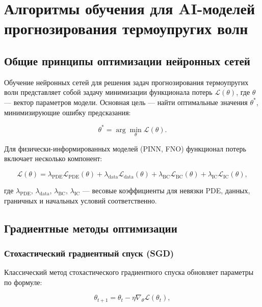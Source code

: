\section{Алгоритмы обучения для AI-моделей прогнозирования термоупругих волн}

\subsection{Общие принципы оптимизации нейронных сетей}

Обучение нейронных сетей для решения задач прогнозирования термоупругих волн представляет собой задачу минимизации функционала потерь $\mathcal{L}(\theta)$, где $\theta$ — вектор параметров модели. Основная цель — найти оптимальные значения $\theta^*$, минимизирующие ошибку предсказания:

\begin{equation}
\theta^* = \arg\min_{\theta} \mathcal{L}(\theta).
\end{equation}

Для физически-информированных моделей (PINN, FNO) функционал потерь включает несколько компонент:

\begin{equation}
\mathcal{L}(\theta) = \lambda_{\text{PDE}} \mathcal{L}_{\text{PDE}}(\theta) + \lambda_{\text{data}} \mathcal{L}_{\text{data}}(\theta) + \lambda_{\text{BC}} \mathcal{L}_{\text{BC}}(\theta) + \lambda_{\text{IC}} \mathcal{L}_{\text{IC}}(\theta),
\end{equation}

где $\lambda_{\text{PDE}}$, $\lambda_{\text{data}}$, $\lambda_{\text{BC}}$, $\lambda_{\text{IC}}$ — весовые коэффициенты для невязки PDE, данных, граничных и начальных условий соответственно.

\subsection{Градиентные методы оптимизации}

\subsubsection{Стохастический градиентный спуск (SGD)}

Классический метод стохастического градиентного спуска обновляет параметры по формуле:

\begin{equation}
\theta_{t+1} = \theta_t - \eta \nabla_{\theta} \mathcal{L}(\theta_t),
\end{equation}

